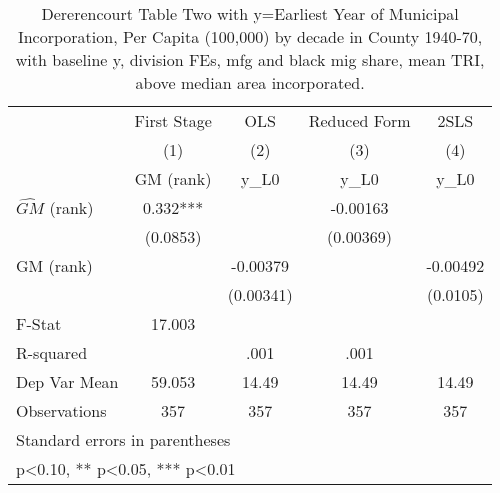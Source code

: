 \begin{table}[htbp]\centering
\def\sym#1{\ifmmode^{#1}\else\(^{#1}\)\fi}
\caption{Dererencourt Table Two with y=Earliest Year of Municipal Incorporation, Per Capita (100,000) by decade in County 1940-70, with baseline y, division FEs, mfg and black mig share, mean TRI, above median area incorporated.}
\begin{tabular}{l*{4}{c}}
\toprule
                    & First Stage   &         OLS   &Reduced Form   &        2SLS   \\
                    &\multicolumn{1}{c}{(1)}&\multicolumn{1}{c}{(2)}&\multicolumn{1}{c}{(3)}&\multicolumn{1}{c}{(4)}\\
                    &\multicolumn{1}{c}{GM  (rank)}&\multicolumn{1}{c}{y\_L0}&\multicolumn{1}{c}{y\_L0}&\multicolumn{1}{c}{y\_L0}\\
\midrule
$\hat{GM}$ (rank)   &       0.332***&               &    -0.00163   &               \\
                    &    (0.0853)   &               &   (0.00369)   &               \\
\addlinespace
GM  (rank)          &               &    -0.00379   &               &    -0.00492   \\
                    &               &   (0.00341)   &               &    (0.0105)   \\
\midrule
F-Stat              &      17.003   &               &               &               \\
R-squared           &               &        .001   &        .001   &               \\
Dep Var Mean        &      59.053   &       14.49   &       14.49   &       14.49   \\
Observations        &         357   &         357   &         357   &         357   \\
\bottomrule
\multicolumn{5}{l}{\footnotesize Standard errors in parentheses}\\
\multicolumn{5}{l}{\footnotesize * p<0.10, ** p<0.05, *** p<0.01}\\
\end{tabular}
\end{table}
